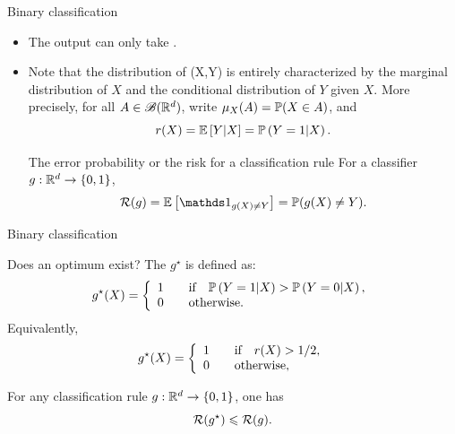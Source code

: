 \documentclass[xcolor={usenames,dvipsnames},handout]{beamer}
\begin{document}
\begin{frame}{Binary classification}

\begin{itemize}
\item The output can only take .


\item Note that the distribution of (X,Y) is entirely characterized by the marginal distribution of $X$ and the conditional distribution of  $Y$ given $X$. More precisely, for all $A\in \mathscr{B}(\R^d)$, write $\mu_X(A) = \P ( X \in A )$, and
$$
r(X) = \E \left[ Y | X\right] = \P \left( Y=1 | X \right).
$$



\begin{block}{The {error probability} or the {risk for a classification rule}}
For a classifier $g : \R^d \to \{0,1\}$,
$$
\Rc(g) = \E \left[ \one_{g(X)\neq Y} \right] =  \P (g(X) \neq Y).
$$
\end{block}

\end{itemize}
\end{frame}

\begin{frame}{Binary classification}

\begin{block}{Does an optimum exist?} 
The  $g^\star$ is defined as:
$$
g^{\star}(X) =
\left\{
	\begin{array}{cc}
		1 &\quad \text{if} \quad \P \left( Y=1 | X \right) > \P \left( Y=0 | X \right), \\
		0 &\quad \text{otherwise}. \hfill
	\end{array}
\right.
$$
Equivalently,
$$
g^{\star}(X) =
\left\{
	\begin{array}{cc}
		1 &\quad \text{if} \quad r(X) > 1/2, \\
		0 &\quad \text{otherwise}, \hfill
	\end{array}
\right.
$$
\end{block}
\begin{lemma}
For any classification rule $g :  \R^d \to \{0,1\}$, one has
$$
\Rc(g^\star) \leq \Rc(g).
$$
\end{lemma}



\end{frame}
\end{document}
